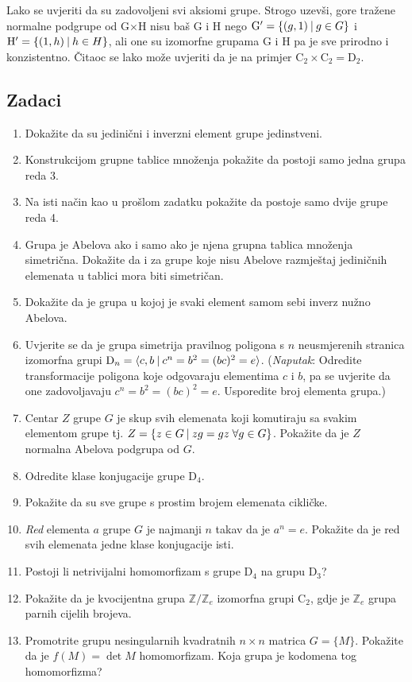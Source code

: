 Lako se uvjeriti da su zadovoljeni svi aksiomi grupe. Strogo 
uzevši, gore tražene normalne podgrupe od G$\times$H nisu baš G i H nego
    $\mathrm{G}' = \{ (g, 1) \: | \: g \in G \}$ i
    $\mathrm{H}' = \{ (1, h) \: | \: h \in H \}$,
ali one su izomorfne grupama G i H pa je sve prirodno i konzistentno.
Čitaoc se lako može uvjeriti da je na primjer
$\mathrm{C}_2 \times \mathrm{C}_2 = \mathrm{D}_2$.

\subsection*{Zadaci}

\begin{enumerate}[label=\arabic{chapter}.\arabic*.]
\item Dokažite da su jedinični i inverzni element grupe jedinstveni.
\item Konstrukcijom grupne tablice množenja pokažite da postoji samo
jedna grupa reda 3.
\item Na isti način kao u prošlom zadatku pokažite da postoje samo
dvije grupe reda 4.
\item Grupa je Abelova ako i samo ako je njena grupna tablica množenja simetrična.
Dokažite da i za grupe koje nisu Abelove razmještaj jediničnih elemenata u tablici
mora biti simetričan.
\item Dokažite da je grupa u kojoj je svaki element samom sebi inverz nužno Abelova.
\item Uvjerite se da je grupa simetrija pravilnog poligona s $n$ neusmjerenih
    stranica izomorfna grupi $\mathrm{D}_n=\langle c,b \: | \: c^n = b^2 = (bc)^2 = e \rangle $.
    (\emph{Naputak}: Odredite transformacije poligona koje odgovaraju elementima $c$ i
 $b$, pa se uvjerite da one zadovoljavaju $c^n = b^2 = (bc)^2 = e$. Usporedite
broj elementa grupa.)\label{zad:Dn}
\item \label{zad:centar} Centar $Z$ grupe $G$ je skup svih elemenata koji komutiraju sa svakim
elementom grupe tj. $Z=\{z\in G \: | \: zg=gz \; \forall g\in G\}$. Pokažite da
je $Z$ normalna Abelova podgrupa od $G$.
\item Odredite klase konjugacije grupe D$_4$.
\item Pokažite da su sve grupe s prostim brojem elemenata cikličke.
\item \emph{Red} elementa $a$ grupe $G$ je najmanji $n$ takav da je $a^n=e$.
    Pokažite da je red svih elemenata jedne klase konjugacije isti.\label{zad:redel}
\item Postoji li netrivijalni homomorfizam s grupe D$_4$ na grupu D$_3$?
\item Pokažite da je kvocijentna grupa $\mathbb{Z}/\mathbb{Z}_e$
izomorfna grupi C$_2$, gdje je $\mathbb{Z}_e$ grupa parnih cijelih brojeva.
\item Promotrite grupu nesingularnih kvadratnih $n\times n$ 
matrica $G=\{M\}$. Pokažite da je $f(M)=\det M$ homomorfizam.
Koja grupa je kodomena tog homomorfizma?
\end{enumerate}

